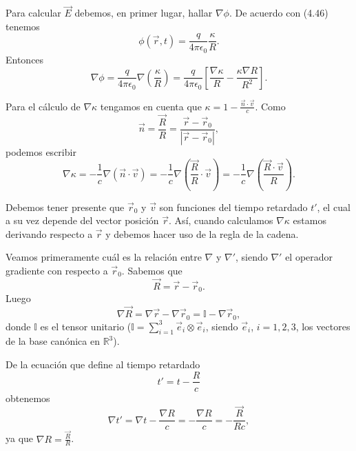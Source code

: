 \documentclass[12pt,a4paper]{book}
\begin{document}
Para calcular $\vec{E}$ debemos, en primer lugar, hallar $\nabla\phi$. De acuerdo con (4.46) tenemos
\begin{equation}
\phi(\vec{r}, t) = \frac{q}{4\pi\epsilon_0}\frac{\kappa}{R}.
\end{equation}
Entonces
\begin{equation}
\nabla\phi = \frac{q}{4\pi\epsilon_0}\nabla\left(\frac{\kappa}{R}\right) = \frac{q}{4\pi\epsilon_0}\left[\frac{\nabla\kappa}{R} - \frac{\kappa\nabla R}{R^2}\right].
\end{equation}

Para el cálculo de $\nabla\kappa$ tengamos en cuenta que $\kappa = 1 - \frac{\vec{n} \cdot \vec{v}}{c}$. Como
\begin{equation}
\vec{n} = \frac{\vec{R}}{R} = \frac{\vec{r} - \vec{r}_0}{|\vec{r} - \vec{r}_0|},
\end{equation}
podemos escribir
\begin{equation}
\nabla\kappa = -\frac{1}{c}\nabla(\vec{n} \cdot \vec{v}) = -\frac{1}{c}\nabla\left(\frac{\vec{R}}{R} \cdot \vec{v}\right) = -\frac{1}{c}\nabla\left(\frac{\vec{R} \cdot \vec{v}}{R}\right).
\end{equation}

Debemos tener presente que $\vec{r}_0$ y $\vec{v}$ son funciones del tiempo retardado $t'$, el cual a su vez depende del vector posición $\vec{r}$. Así, cuando calculamos $\nabla\kappa$ estamos derivando respecto a $\vec{r}$ y debemos hacer uso de la regla de la cadena.

Veamos primeramente cuál es la relación entre $\nabla$ y $\nabla'$, siendo $\nabla'$ el operador gradiente con respecto a $\vec{r}_0$. Sabemos que
\begin{equation}
\vec{R} = \vec{r} - \vec{r}_0.
\end{equation}
Luego
\begin{equation}
\nabla\vec{R} = \nabla\vec{r} - \nabla\vec{r}_0 = \mathbb{I} - \nabla\vec{r}_0,
\end{equation}
donde $\mathbb{I}$ es el tensor unitario ($\mathbb{I} = \sum_{i=1}^3 \vec{e}_i \otimes \vec{e}_i$, siendo $\vec{e}_i$, $i = 1, 2, 3$, los vectores de la base canónica en $\mathbb{R}^3$). 

De la ecuación que define al tiempo retardado
\begin{equation}
t' = t - \frac{R}{c}
\end{equation}
obtenemos
\begin{equation}
\nabla t' = \nabla t - \frac{\nabla R}{c} = -\frac{\nabla R}{c} = -\frac{\vec{R}}{Rc},
\end{equation}
ya que $\nabla R = \frac{\vec{R}}{R}$.
\end{document}
